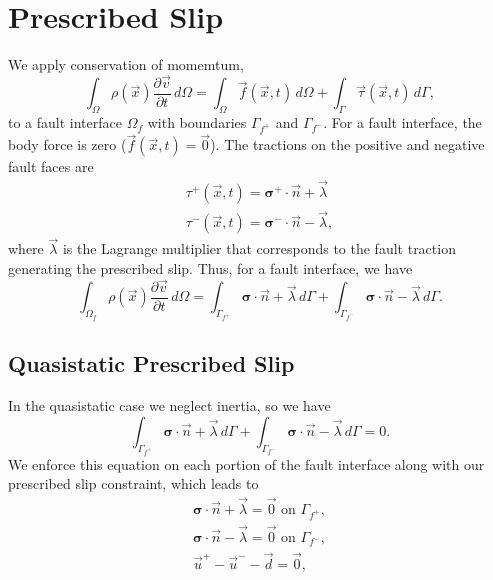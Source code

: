 \documentclass{article}
\newcommand{\tensor}[1]{\bm{#1}}
\begin{document}
\section{Prescribed Slip}

We apply conservation of momemtum,
\begin{equation}
  \int_\Omega \rho(\vec{x}) \frac{\partial \vec{v}}{\partial t} \, d\Omega = \int_\Omega \vec{f}(\vec{x},t) \, d\Omega + \int_\Gamma \vec{\tau}(\vec{x},t) \, d\Gamma,
\end{equation}
to a fault interface $\Omega_f$ with boundaries $\Gamma_{f^+}$ and $\Gamma_{f^-}$.
For a fault interface, the body force is zero ($\vec{f}(\vec{x},t) = \vec{0}$).
The tractions on the positive and negative fault faces are
\begin{gather}
  \tau^+(\vec{x},t) = \tensor{\sigma}^+ \cdot \vec{n} + \vec{\lambda} \\
  \tau^-(\vec{x},t) = \tensor{\sigma}^- \cdot \vec{n} - \vec{\lambda},
\end{gather}
where $\vec{\lambda}$ is the Lagrange multiplier that corresponds to the fault traction generating the prescribed slip.
Thus, for a fault interface, we have
\begin{equation}
  \int_{\Omega_f} \rho(\vec{x}) \frac{\partial \vec{v}}{\partial t} \, d\Omega = \int_{\Gamma_{f^+}} \tensor{\sigma} \cdot \vec{n} + \vec{\lambda} \, d\Gamma + \int_{\Gamma_{f^-}} \tensor{\sigma} \cdot \vec{n} - \vec{\lambda} \, d\Gamma.
\end{equation}

\subsection{Quasistatic Prescribed Slip}

In the quasistatic case we neglect inertia, so we have
\begin{equation}
  \int_{\Gamma_{f^+}} \tensor{\sigma} \cdot \vec{n} + \vec{\lambda} \, d\Gamma + \int_{\Gamma_{f^-}} \tensor{\sigma} \cdot \vec{n} - \vec{\lambda} \, d\Gamma = 0.
\end{equation}
We enforce this equation on each portion of the fault interface along with our prescribed slip constraint, which leads to
\begin{gather}
  \tensor{\sigma} \cdot \vec{n} + \vec{\lambda} = \vec{0} \text{ on } \Gamma_{f^+}, \\
  \tensor{\sigma} \cdot \vec{n} - \vec{\lambda} = \vec{0}\text{ on } \Gamma_{f^-}, \\
  \vec{u}^+ - \vec{u}^- - \vec{d} = \vec{0},  
\end{gather}
\end{document}
